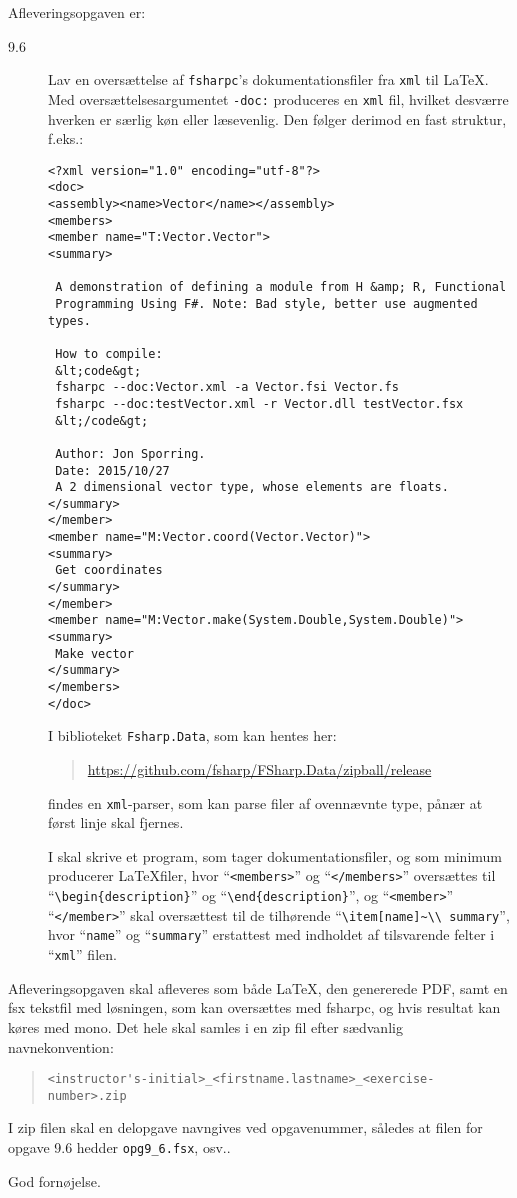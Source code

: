 \documentclass[a4paper,12pt]{article}
\begin{document}
Afleveringsopgaven er:
\begin{description}
\item[9.6] Lav en oversættelse af \lstinline|fsharpc|'s dokumentationsfiler fra \lstinline|xml| til \LaTeX. Med oversættelsesargumentet \lstinline|-doc:| produceres en \lstinline|xml| fil, hvilket desværre hverken er særlig køn eller læsevenlig. Den følger derimod en fast struktur, f.eks.:
\begin{lstlisting}
<?xml version="1.0" encoding="utf-8"?>
<doc>
<assembly><name>Vector</name></assembly>
<members>
<member name="T:Vector.Vector">
<summary>

 A demonstration of defining a module from H &amp; R, Functional
 Programming Using F#. Note: Bad style, better use augmented types.

 How to compile:
 &lt;code&gt;
 fsharpc --doc:Vector.xml -a Vector.fsi Vector.fs
 fsharpc --doc:testVector.xml -r Vector.dll testVector.fsx
 &lt;/code&gt;

 Author: Jon Sporring.
 Date: 2015/10/27
 A 2 dimensional vector type, whose elements are floats.
</summary>
</member>
<member name="M:Vector.coord(Vector.Vector)">
<summary>
 Get coordinates
</summary>
</member>
<member name="M:Vector.make(System.Double,System.Double)">
<summary>
 Make vector
</summary>
</members>
</doc>
\end{lstlisting}
I biblioteket \lstinline|Fsharp.Data|, som kan hentes her:
\begin{quote}
  \url{https://github.com/fsharp/FSharp.Data/zipball/release}
\end{quote}
findes en \lstinline|xml|-parser, som kan parse filer af ovennævnte type, pånær at først linje skal fjernes.

I skal skrive et program, som tager dokumentationsfiler, og som
minimum producerer \LaTeX filer, hvor "`\lstinline|<members>|"' og
"`\lstinline|</members>|"' oversættes til
"`\lstinline|\begin{description}|"' og
  "`\lstinline|\end{description}|"', og "`\lstinline|<member>|"'
"`\lstinline|</member>|"' skal oversættest til de tilhørende
"`\lstinline|\item[name]~\\ summary|"', hvor "`\lstinline|name|"' og
"`\lstinline|summary|"' erstattest med indholdet af tilsvarende felter
i "`\lstinline|xml|"' filen.
\end{description}
Afleveringsopgaven skal afleveres som både LaTeX, den genererede PDF,
samt en fsx tekstfil med løsningen, som kan oversættes med fsharpc, og
hvis resultat kan køres med mono. Det hele skal samles i en zip fil
efter sædvanlig navnekonvention:
\begin{quote}
  \lstinline|<instructor's-initial>_<firstname.lastname>_<exercise-number>.zip|
\end{quote}
I zip filen skal en delopgave navngives ved opgavenummer, således at
filen for opgave 9.6 hedder \lstinline|opg9_6.fsx|, osv..

\flushright God fornøjelse.
\end{document}

